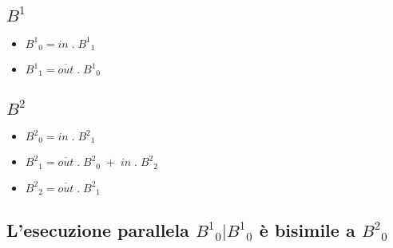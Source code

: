 \subsection{${B^1}$}

\begin{itemize}
  \item ${B^1}_0 = in \; . \; {B^1}_1$
  \item ${B^1}_1 = \overline {out} \; . \; {B^1}_0$
\end{itemize}


\subsection{${B^2}$}

\begin{itemize}
  \item ${B^2}_0 = in \; . \; {B^2}_1$
  \item ${B^2}_1 = \overline {out} \; . \; {B^2}_0 \; + \; in \; . \; {B^2}_2$
  \item ${B^2}_2 = \overline {out} \; . \; {B^2}_1$
\end{itemize}


\subsection{L'esecuzione parallela ${B^1}_0 | {B^1}_0$ \`e bisimile a ${B^2}_0$}

